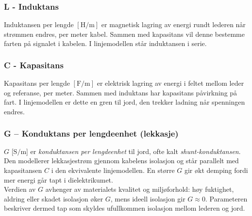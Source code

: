 \subsubsection{L - Induktans}
Induktansen per lengde $[\mathrm{H}/\mathrm{m}]$ er magnetisk lagring av energi rundt lederen når strømmen endres, per meter kabel. Sammen med kapasitans vil denne bestemme farten på signalet i kabelen. I linjemodellen står induktansen i serie.

\subsubsection{C - Kapasitans}
Kapasitans per lengde $[\mathrm{F}/\mathrm{m}]$ er elektrisk lagring av energi i feltet mellom leder og referanse, per meter. Sammen med induktans har kapasitans påvirkning på fart. I linjemodellen er dette en gren til jord, den trekker ladning når spenningen endres.

\subsubsection{G -- Konduktans per lengdeenhet (lekkasje)}
$G$ [$\mathrm{S/m}$] er \textit{konduktansen per lengdeenhet} til jord, ofte kalt 
\textit{shunt-konduktansen}. Den modellerer lekkasjestrøm gjennom kabelens isolasjon og står 
parallelt med kapasitansen $C$ i den ekvivalente linjemodellen. En større $G$ gir økt demping 
fordi mer energi går tapt i dielektrikumet. 
\\[1em]
Verdien av $G$ avhenger av materialets kvalitet og miljøforhold: høy fuktighet, aldring eller 
skadet isolasjon øker $G$, mens ideell isolasjon gir $G \approx 0$. Parameteren beskriver dermed 
tap som skyldes ufullkommen isolasjon mellom lederen og jord.
\clearpage
